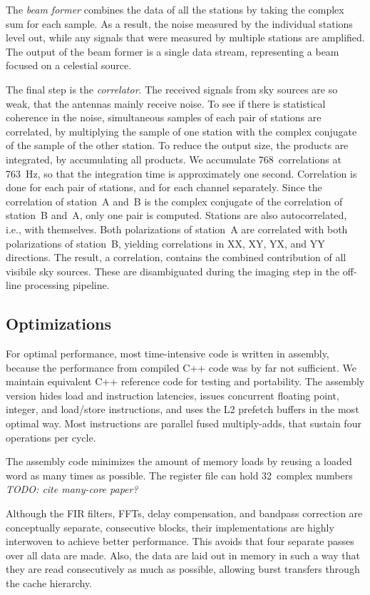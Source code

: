 \documentclass{sig-alternate}
\begin{document}
The \emph{beam former} combines the data of all the stations by taking the
complex sum for each sample. As a result, the noise measured by the individual
stations level out, while any signals that were measured by multiple stations
are amplified. The output of the beam former is a single data stream,
representing a beam focused on a celestial source.


The final step is the \emph{correlator}.
The received signals from sky sources are so weak, that the antennas mainly
receive noise.
To see if there is statistical coherence in the noise, simultaneous samples of
each pair of stations are correlated, by multiplying the sample of one station
with the complex conjugate of the sample of the other station.
To reduce the output size, the products are integrated, by accumulating all
products.
We accumulate 768~correlations at 763~Hz, so that the integration time is
approximately one second.
Correlation is done for each pair of stations, and for each channel separately.
Since the correlation of station~A and~B is the complex conjugate of the
correlation of station~B and~A, only one pair is computed.
Stations are also autocorrelated, i.e., with themselves.
Both polarizations of station~A are correlated with both polarizations of
station~B, yielding correlations in XX, XY, YX, and YY directions.
The result, a correlation, contains the combined contribution of all visibile
sky sources.
These are disambiguated during the imaging step in the off-line processing
pipeline.


\subsection{Optimizations}

For optimal performance, most time-intensive code is written in assembly,
because the performance from compiled C++ code was by far not sufficient.
We maintain equivalent C++ reference code for testing and portability.
The assembly version hides load and instruction latencies, issues concurrent
floating point, integer, and load/store instructions,
and uses the L2 prefetch buffers in the most optimal way.
Most instructions are parallel fused multiply-adds, that sustain four
operations per cycle.

The assembly code minimizes the amount of memory loads by reusing a loaded
word as many times as possible.
The register file can hold 32~complex numbers \emph{TODO: cite many-core paper?}

Although the FIR filters, FFTs, delay compensation, and bandpass correction
are conceptually separate, consecutive blocks, their implementations are
highly interwoven to achieve better performance.
This avoids that four separate passes over all data are made.
Also, the data are laid out in memory in such a way that they are read
consecutively as much as possible, allowing burst transfers through the
cache hierarchy.
\end{document}
